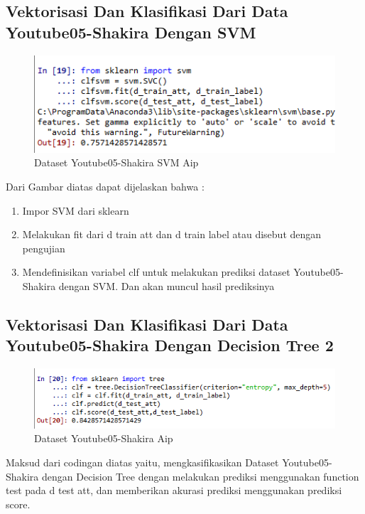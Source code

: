 \subsection{Vektorisasi Dan Klasifikasi Dari Data Youtube05-Shakira Dengan SVM}
\begin{figure}[!hbtp]
\centering
\includegraphics[scale=0.5]{figures/AIP/c8.PNG}
\caption{Dataset Youtube05-Shakira SVM Aip}
\label{Praktek}
\end{figure}
Dari Gambar diatas dapat dijelaskan bahwa :
\begin{enumerate}
\item Impor SVM dari sklearn
\item Melakukan fit dari d train att dan d train label atau disebut dengan pengujian
\item Mendefinisikan variabel clf untuk melakukan prediksi dataset Youtube05-Shakira dengan SVM. Dan akan muncul hasil prediksinya
\end{enumerate}

\subsection{Vektorisasi Dan Klasifikasi Dari Data Youtube05-Shakira Dengan Decision Tree 2}
\begin{figure}[!hbtp]
\centering
\includegraphics[scale=0.5]{figures/AIP/c9.PNG}
\caption{Dataset Youtube05-Shakira Aip}
\label{Praktek}
\end{figure}
Maksud dari codingan diatas yaitu, mengkasifikasikan Dataset Youtube05-Shakira dengan Decision Tree dengan melakukan prediksi menggunakan function test pada d test att, dan memberikan akurasi prediksi menggunakan prediksi score.

